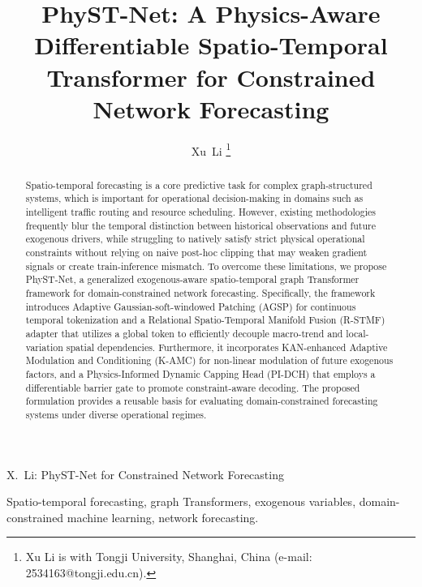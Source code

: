\documentclass[lettersize,journal]{IEEEtran}
\begin{document}
\title{PhyST-Net: A Physics-Aware Differentiable Spatio-Temporal Transformer for Constrained Network Forecasting}

\author{Xu~Li
\thanks{Xu Li is with Tongji University, Shanghai, China (e-mail: 2534163@tongji.edu.cn).}%
}

%
{X.~Li: PhyST-Net for Constrained Network Forecasting}

\maketitle

\begin{abstract}
Spatio-temporal forecasting is a core predictive task for complex graph-structured systems, which is important for operational decision-making in domains such as intelligent traffic routing and resource scheduling. However, existing methodologies frequently blur the temporal distinction between historical observations and future exogenous drivers, while struggling to natively satisfy strict physical operational constraints without relying on naive post-hoc clipping that may weaken gradient signals or create train-inference mismatch. To overcome these limitations, we propose PhyST-Net, a generalized exogenous-aware spatio-temporal graph Transformer framework for domain-constrained network forecasting. Specifically, the framework introduces Adaptive Gaussian-soft-windowed Patching (AGSP) for continuous temporal tokenization and a Relational Spatio-Temporal Manifold Fusion (R-STMF) adapter that utilizes a global token to efficiently decouple macro-trend and local-variation spatial dependencies. Furthermore, it incorporates KAN-enhanced Adaptive Modulation and Conditioning (K-AMC) for non-linear modulation of future exogenous factors, and a Physics-Informed Dynamic Capping Head (PI-DCH) that employs a differentiable barrier gate to promote constraint-aware decoding. The proposed formulation provides a reusable basis for evaluating domain-constrained forecasting systems under diverse operational regimes.
\end{abstract}

\begin{IEEEkeywords}
Spatio-temporal forecasting, graph Transformers, exogenous variables, domain-constrained machine learning, network forecasting.
\end{IEEEkeywords}











\end{document}

